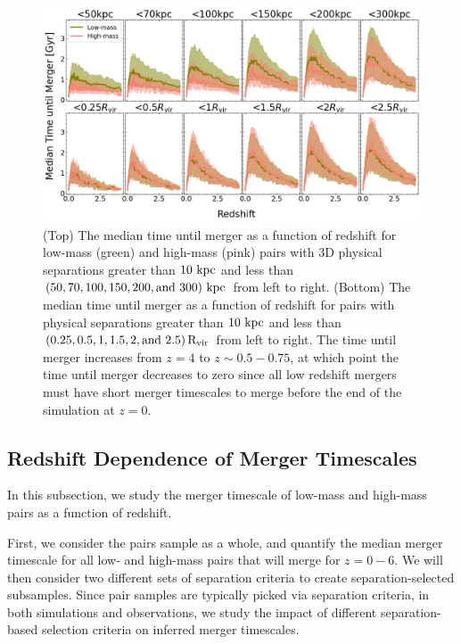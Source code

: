 \documentclass[twocolumn,linenumbers]{aastex631}
\begin{document}
    \begin{figure}[htb]
        \centering
        \includegraphics[width=\textwidth]{plots/bet-on-it/3_time_til_merger.png}
        \caption{(Top) The median time until merger as a function of redshift for low-mass (green) and high-mass (pink) pairs with 3D physical separations greater than $10\,\mathrm{\,kpc}$ and less than $(50,70,100,150,200,\mbox{and }300)\,\mathrm{\,kpc}$ from left to right. 
        (Bottom) The median time until merger as a function of redshift for pairs with physical separations greater than $10\,\mathrm{\,kpc}$ and less than $(0.25, 0.5, 1, 1.5, 2,\mbox{and }2.5)\,\rm R_{vir}$ from left to right. 
        The time until merger increases from $z=4$ to $z\sim0.5-0.75$, at which point the time until merger decreases to zero since all low redshift mergers must have short merger timescales to merge before the end of the simulation at $z=0$. 
        }
        \label{fig:timescales-sep}
    \end{figure} 
    
\subsection{Redshift Dependence of Merger Timescales}\label{sec:results-timevredshift}
    In this subsection, we study the merger timescale of low-mass and high-mass pairs as a function of redshift. 
    
    First, we consider the pairs sample as a whole, and quantify the median merger timescale for all low- and high-mass pairs that will merge for $z=0-6$. 
    We will then consider two different sets of separation criteria to create separation-selected subsamples.
    Since pair samples are typically picked via separation criteria, in both simulations and observations, we study the impact of different separation-based selection criteria on inferred merger timescales.
    
\end{document}
